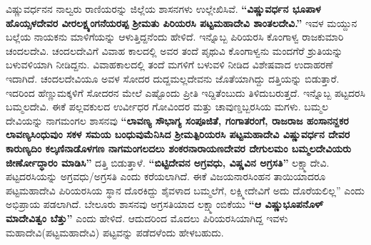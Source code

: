 ವಿಷ್ಣುವರ್ಧನನ ನಾಲ್ವರು ರಾಣಿಯರನ್ನು ಜಿಲ್ಲೆಯ ಶಾಸನಗಳು ಉಲ್ಲೇಖಿಸಿವೆ. \textbf{“ವಿಷ್ಣುವರ್ಧನ ಭೂಪಾಳ ಹೊಯ್ಸಳದೇವರ ವೀರಲಕ್ಷ್ಯಂಗನೆಯರಪ್ಪ ಶ‍್ರೀಮತು ಪಿರಿಯರಸಿ ಪಟ್ಟಮಹಾದೇವಿ ಶಾಂತಲದೇವಿ.”} ಇವಳ ಮಯ್ದುನ ಬಲ್ಲೆಯ ನಾಯಕನು ಮಾಳಿಗೆಯನ್ನು ಆಳುತ್ತಿದ್ದನೆಂದು ಹೇಳಿದೆ. ಇನ್ನೊಬ್ಬ ಪಿರಿಯರಸಿ ಕೊಂಗಾಳ್ವ ರಾಜಕುಮಾರಿ ಚಂದಲದೇವಿ. ಚಂದಲದೇವಿಗೆ ವಿವಾಹ ಕಾಲದಲ್ಲಿ ಅವರ ತಂದೆ ಪೃಥುವಿ ಕೊಂಗಾಳ್ವನು ಮಂದಗೆರೆ ಶ್ರುತಿಯನ್ನು ಬಳುವಳಿಯಾಗಿ ನೀಡಿದ್ದನು. ವಿವಾಹಕಾಲದಲ್ಲಿ ತಂದೆ ಮಗಳಿಗೆ ಬಳುವಳಿ ನೀಡಿದ ವಿಶೇಷವಾದ ಉದಾಹರಣೆ ಇದಾಗಿದೆ. ಚಂದಲದೇವಿಯೂ ಅವಳ ಸೋದರ ದುದ್ದಮಲ್ಲದೇವನು ಜೊತೆಯಾಗಿದ್ದು ದತ್ತಿಯನ್ನು ಬಿಡುತ್ತಾರೆ. ಇದರಿಂದ ಹೆಣ್ಣುಮಕ್ಕಳಿಗೆ ಸೋದರನ ಮೇಲೆ ಎಷ್ಟೊಂದು ಪ್ರೀತಿ ಇದ್ದಿತೆಂಬುದು ತಿಳಿದುಬರುತ್ತದೆ. ಇನ್ನೊಬ್ಬ ಪಟ್ಟದರಸಿ ಬಮ್ಮಲದೇವಿ. ಈಕೆ ಪಲ್ಲವಕುಲದ ಉರ್ವೀಧರ ಗೋವಿಂದರ ಮತ್ತು ಚಾವುಣ್ಡಬ್ಬರಸಿಯ ಮಗಳು. ಬಮ್ಮಲ ದೇವಿಯನ್ನು ನಾಗಮಂಗಲ ಶಾಸನವು \textbf{“ಲಾವಣ್ಯ ಸೌಭಾಗ್ಯ ಸಂಪೂಜಿತೆ, ಗಂಗಾತರಂಗೆ, ರಾಜರಾಜ ಹಂಸಾನನ್ದಕರ ಲಾವಣ್ಯಸಿಂಧುವುಂ ಸಕಳ ಸಮಯ ಬಂಧುವುಮೆನಿಸಿದ ಶ‍್ರೀಮತ್ಪಿರಿಯರಸಿ ಪಟ್ಟಮಹಾದೇವಿ ವಿಷ್ಣುವರ್ಧನ ದೇವರ ಕಾರುಣ್ಯದಿಂ ಕಲ್ಕಣಿನಾಡೊಳಗಣ\general{\break } ನಾಗಮಂಗಲದಲು ಶಂಕರನಾರಾಯಣದೇವರ ದೇಗುಲಮಂ ಬಮ್ಮಲದೇವಿಯರು ಜೀರ್ಣೋದ್ಧಾರಂ ಮಾಡಿಸಿ”} ದತ್ತಿ ಬಿಡುತ್ತಾಳೆ. \textbf{“ಬಿಟ್ಟಿದೇವನ ಅಗ್ರವಧು, ವಿಷ್ಣವಿನ ಅಗ್ರಸತಿ”} ಲಕ್ಷ್ಮಾದೇವಿ. ಪಟ್ಟದರಸಿಯನ್ನು ಅಗ್ರವಧು/ಅಗ್ರಸತಿ ಎಂದು ಕರೆಯಲಾಗಿದೆ. ಈಕೆ ವಿಜಯನಾರಸಿಂಹನ ತಾಯಿಯಾದರೂ ಪಟ್ಟಮಹಾದೇವಿ ಪಿರಿಯರಸಿಯ ಸ್ಥಾನ ದೊರಕಿದ್ದು ಶೈವಳಾದ ಬಮ್ಮಲೆಗೆ, ಲಕ್ಷ್ಮೀದೇವಿಗೆ ಅದು ದೊರೆಯಲಿಲ್ಲ” ಎಂದು ಅಭಿಪ್ರಾಯ ಪಡಲಾಗಿದೆ. ಬೇಲೂರು ಶಾಸನವು ಅಗ್ರಸತಿಯಾದ ಲಕ್ಷ್ಮಾಂಬಿಕೆಯು \textbf{“ಆ ವಿಷ್ಣುಭೂಪನೊಳ್​ ಮಾದೇವಿತ್ವಂ ಬೆತ್ತು”} ಎಂದು ಹೇಳಿದೆ. ಆದುದರಿಂದ ಮೊದಲು ಪಿರಿಯರಸಿಯಾಗಿದ್ದ ಇವಳು ಮಹಾದೇವಿ(ಪಟ್ಟಮಹಾದೇವಿ) ಪಟ್ಟವನ್ನು ಪಡೆದಳೆಂದು ಹೇಳಬಹುದು.

